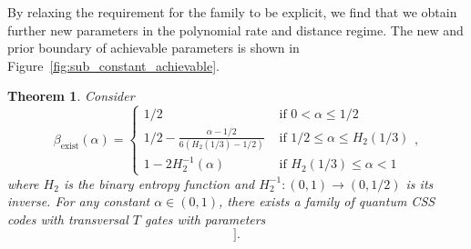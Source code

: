 \documentclass{article}
\newtheorem{theorem}{Theorem}
\begin{document}
By relaxing the requirement for the family to be explicit, we find that we obtain further new parameters in the polynomial rate and distance regime. The new and prior boundary of achievable parameters is shown in Figure~\ref{fig:sub_constant_achievable}.
\begin{theorem}\label{thm:sub_constant_exist}
    Consider
    \begin{equation}\label{eq:exist_exponent_boundary}
        \beta_{\text{exist}}(\alpha) = \begin{cases}
            1/2 &\text{ if } 0 < \alpha \leq 1/2\\
            1/2 - \frac{\alpha-1/2}{6\left(H_2(1/3)-1/2\right)} &\text{ if } 1/2 \leq \alpha \leq H_2(1/3)\\
            1-2H_2^{-1}(\alpha) &\text{ if } H_2(1/3) \leq \alpha < 1
        \end{cases},
    \end{equation}
    where $H_2$ is the binary entropy function and $H_2^{-1}:(0,1)\to(0,1/2)$ is its inverse. For any constant $\alpha \in (0,1)$, there exists a family of quantum CSS codes with transversal $T$ gates with parameters 
    \begin{equation}
        [[n,\Omega(n^{\alpha+o(1)}), \Omega(n^{\beta_{\text{exist}}(\alpha)+ o(1)})]].
    \end{equation}
\end{theorem}
\end{document}

